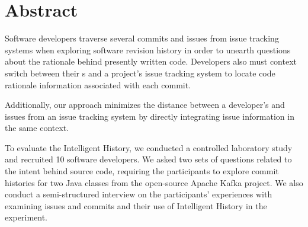 
\chapter{Abstract}


Software developers traverse several commits and issues from issue tracking systems 
when exploring software revision history in order to unearth questions about the rationale behind presently written code.
Developers also must context switch between their s and a project's 
issue tracking system to locate code rationale information associated with each commit.

Additionally, our approach minimizes the distance between a developer's  and issues from an issue tracking system
by directly integrating issue information in the same context.

To evaluate the Intelligent History, we conducted a controlled laboratory study and recruited 10 software developers.
We asked two sets of questions related to the intent behind source code, requiring the participants to explore 
commit histories for two Java classes from the open-source Apache Kafka project.
We also conduct a semi-structured interview on the participants' experiences with examining issues and commits 
and their use of Intelligent History in the experiment.

